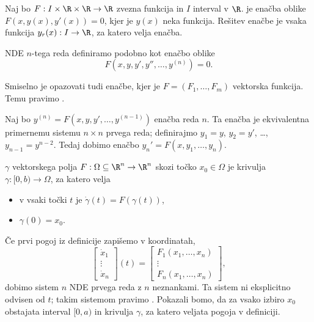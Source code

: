 
\begin{definicija}
  Naj bo $F: I \times \R \times \R \to \R$ zvezna funkcija in $I$ interval v
  $\R$.
   je enačba oblike $F(x, y(x),
  y'(x)) = 0$, kjer je $y(x)$ neka funkcija.
  Rešitev enačbe je vsaka funkcija $y_r(x) : I \to \R$, za katero velja enačba.
\end{definicija}

\begin{opomba}
  NDE $n$-tega reda definiramo podobno kot enačbo oblike
  \[
    F(x, y, y', y'', \ldots, y^{(n)}) = 0.
  \]
\end{opomba}

\begin{opomba}
  Smiselno je opazovati tudi enačbe, kjer je $F = (F_1, \ldots, F_m)$ vektorska
  funkcija.
  Temu pravimo .
\end{opomba}

\begin{opomba}
  Naj bo $y^{(n)} = F(x, y, y', \ldots, y^{(n-1)})$ enačba reda $n$.
  Ta enačba je ekvivalentna primernemu sistemu $n \times n$ prvega reda;
  definirajmo $y_1 = y$, $y_2 = y'$, \ldots, $y_{n-1} = y^{n-2}$.
  Tedaj dobimo enačbo $y_n' = F(x, y_1, \ldots, y_n)$.
\end{opomba}

\begin{definicija}
   $\gamma$ vektorskega polja $F: \Omega \subseteq
  \R^n \to \R^n$ skozi točko $x_0 \in \Omega$ je krivulja $\gamma : [0, b) \to
  \Omega$, za katero velja
  \begin{itemize}
  \item v vsaki točki $t$ je $\dot{\gamma}(t) = F(\gamma(t))$,
  \item $\gamma(0) = x_0$.
  \end{itemize}
\end{definicija}


Če prvi pogoj iz definicije zapišemo v koordinatah,
\[
  \begin{bmatrix}
    \dot{x}_1 \\ \vdots \\ \dot{x}_n
  \end{bmatrix} (t)
  =
  \begin{bmatrix}
    F_1(x_1, \ldots, x_n) \\ \vdots \\ F_n(x_1, \ldots, x_n)
  \end{bmatrix},
\]
dobimo sistem $n$ NDE prvega reda z $n$ neznankami.
Ta sistem ni eksplicitno odvisen od $t$; takim sistemom pravimo .
Pokazali bomo, da za vsako izbiro $x_0$ obstajata interval $[0, a)$ in krivulja
$\gamma$, za katero veljata pogoja v definiciji.

